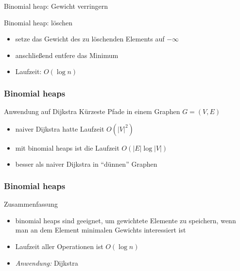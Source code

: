 \documentclass[aspectratio=1610, 11pt]{beamer}
\newcommand{\mytitle}{Binomial heaps}
\begin{document}
\begin{frame}
\begin{overprint}
\begin{exampleblock}{Binomial heap: Gewicht verringern}
\begin{itemize}
			\end{itemize}
		\end{exampleblock}
		\begin{exampleblock}{Binomial heap: l\"oschen}
			\begin{itemize}
				\item setze das Gewicht des zu l\"oschenden Elements auf $-\infty$
				\item anschlie\ss end entfere das Minimum
				\item Laufzeit: $O(\log n)$
			\end{itemize}
		\end{exampleblock}
	\end{overprint}
\end{frame}

\begin{frame}\frametitle{\mytitle}
	\begin{overprint}
		\begin{exampleblock}{Anwendung auf Dijkstra}
			K\"urzeste Pfade in einem Graphen $G=(V,E)$
			\begin{itemize}
				\item naiver Dijkstra hatte Laufzeit $O(|V|^2)$
				\item mit binomial heaps ist die Laufzeit $O(|E|\log|V|)$
				\item besser als naiver Dijkstra in ``d\"unnen'' Graphen
			\end{itemize}
		\end{exampleblock}
	\end{overprint}
\end{frame}

\begin{frame}\frametitle{\mytitle}
	\begin{overprint}
		\onslide<1>
		\begin{exampleblock}{Zusammenfassung}
			\begin{itemize}
				\item binomial heaps sind geeignet, um gewichtete Elemente zu speichern, wenn man an dem Element minimalen Gewichts interessiert ist
				\item Laufzeit aller Operationen ist $O(\log n)$
				\item \emph{Anwendung:} Dijkstra
			\end{itemize}
		\end{exampleblock}
	\end{overprint}
\end{frame}
\end{document}
